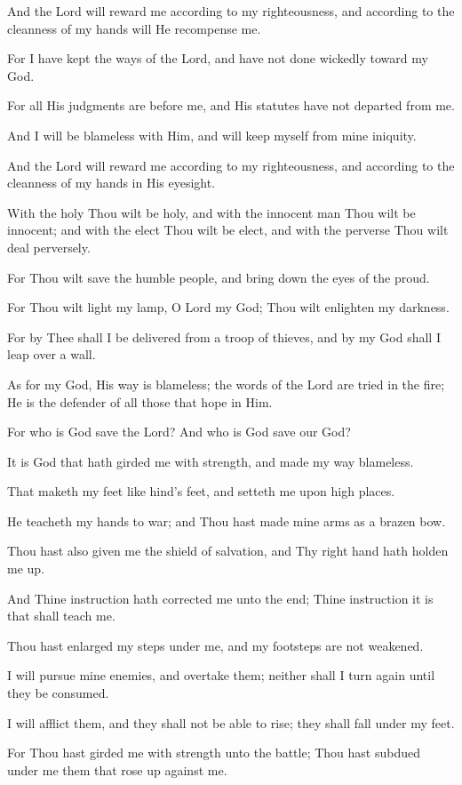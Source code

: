 And the Lord will reward me according to my righteousness, and according to the cleanness of my hands will He recompense me.

For I have kept the ways of the Lord, and have not done wickedly toward my God.

For all His judgments are before me, and His statutes have not departed from me.

And I will be blameless with Him, and will keep myself from mine iniquity.

And the Lord will reward me according to my righteousness, and according to the cleanness of my hands in His eyesight.

With the holy Thou wilt be holy, and with the innocent man Thou wilt be innocent; and with the elect Thou wilt be elect, and with the perverse Thou wilt deal perversely.

For Thou wilt save the humble people, and bring down the eyes of the proud.

For Thou wilt light my lamp, O Lord my God; Thou wilt enlighten my darkness.

For by Thee shall I be delivered from a troop of thieves, and by my God shall I leap over a wall.

As for my God, His way is blameless; the words of the Lord are tried in the fire; He is the defender of all those that hope in Him.

For who is God save the Lord? And who is God save our God?

It is God that hath girded me with strength, and made my way blameless.

That maketh my feet like hind’s feet, and setteth me upon high places.

He teacheth my hands to war; and Thou hast made mine arms as a brazen bow.

Thou hast also given me the shield of salvation, and Thy right hand hath holden me up.

And Thine instruction hath corrected me unto the end; Thine instruction it is that shall teach me.

Thou hast enlarged my steps under me, and my footsteps are not weakened.

I will pursue mine enemies, and overtake them; neither shall I turn again until they be consumed.

I will afflict them, and they shall not be able to rise; they shall fall under my feet.

For Thou hast girded me with strength unto the battle; Thou hast subdued under me them that rose up against me.

